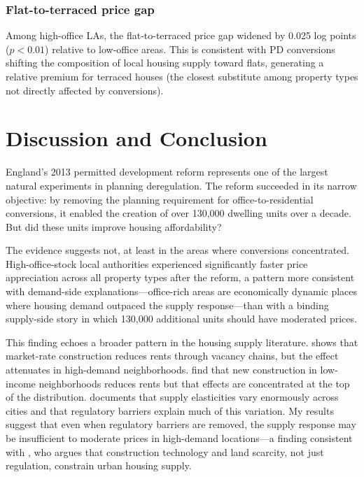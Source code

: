 \documentclass[12pt]{article}
\begin{document}
\subsubsection*{Flat-to-terraced price gap} Among high-office LAs, the flat-to-terraced price gap widened by 0.025 log points ($p < 0.01$) relative to low-office areas. This is consistent with PD conversions shifting the composition of local housing supply toward flats, generating a relative premium for terraced houses (the closest substitute among property types not directly affected by conversions).


\section{Discussion and Conclusion}

England's 2013 permitted development reform represents one of the largest natural experiments in planning deregulation. The reform succeeded in its narrow objective: by removing the planning requirement for office-to-residential conversions, it enabled the creation of over 130,000 dwelling units over a decade. But did these units improve housing affordability?

The evidence suggests not, at least in the areas where conversions concentrated. High-office-stock local authorities experienced significantly faster price appreciation across all property types after the reform, a pattern more consistent with demand-side explanations---office-rich areas are economically dynamic places where housing demand outpaced the supply response---than with a binding supply-side story in which 130,000 additional units should have moderated prices.

This finding echoes a broader pattern in the housing supply literature. \citet{mast2023} shows that market-rate construction reduces rents through vacancy chains, but the effect attenuates in high-demand neighborhoods. \citet{asquith2021} find that new construction in low-income neighborhoods reduces rents but that effects are concentrated at the top of the distribution. \citet{baum2020} documents that supply elasticities vary enormously across cities and that regulatory barriers explain much of this variation. My results suggest that even when regulatory barriers are removed, the supply response may be insufficient to moderate prices in high-demand locations---a finding consistent with \citet{glaeser2018}, who argues that construction technology and land scarcity, not just regulation, constrain urban housing supply.
\end{document}
